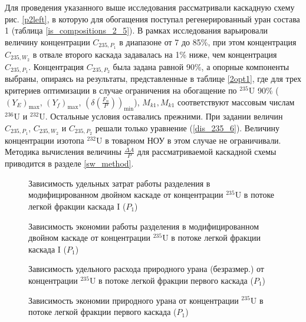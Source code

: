 Для проведения указанного выше исследования рассматривали каскадную схему рис. \ref{p2left}, в которую для обогащения поступал регенерированный уран состава 1 (таблица \ref{is_compositions_2_5}). В рамках исследования варьировали величину концентрации $C_{235,{P_1}}$ в диапазоне от 7 до 85\%, при этом концентрация $C_{235,{W_2}}$ в отвале второго каскада задавалась на 1\% ниже, чем концентрация $C_{235,{P_1}}$. Концентрация $C_{235,{P_2}}$ была задана равной 90\%, а опорные компоненты выбраны, опираясь на результаты, представленные в таблице \ref{2opt1}, где для трех критериев оптимизации в случае ограничения на обогащение по $^{235}$U 90\% ($(Y_{E})_\text{max}$, $(Y_f)_\text{max}$, $(\delta(\frac{F_n}{P}))_\text{min}$), $M_{k1}, M_{k1}$ соответствуют массовым числам $^{236}$U и $^{232}$U. Остальные условия оставались прежними. При задании величин $C_{235,{P_1}}$, $C_{235,{W_2}}$ и $C_{235,{P_2}}$  решали только уравнение (\ref{dis_235_6}). Величину концентрации изотопа $^{232}$U в товарном НОУ в этом случае не ограничивали.
Методика вычисления величины $\frac{\Delta A}{P}$ для рассматриваемой каскадной схемы приводится в разделе \ref{sw_method}.
\begin{figure}[ht]
    \centering
    \begin{minipage}{.5\textwidth}
        \centering
        
  \caption{{Зависимость удельных затрат работы разделения в модифицированном двойном каскаде  от концентрации $^{235}$U в потоке легкой фракции каскада I ($P_1$){\label{SWP1}}}}
  \end{minipage}%
    \begin{minipage}{.5\textwidth}
      \centering
      
\caption{{Зависимость экономии работы разделения в модифицированном двойном каскаде от концентрации $^{235}$U в потоке легкой фракции каскада I ($P_1$){\label{SW_lP1}}}}
    \end{minipage}
\end{figure}

\begin{figure}[ht]
    \centering
    \begin{minipage}{.5\textwidth}
        \centering
        
  \caption{{Зависимость удельного расхода природного урана (безразмер.) от концентрации $^{235}$U в потоке легкой фракции первого каскада ($P_1$){\label{FnuP1}}}}
  \end{minipage}%
    \begin{minipage}{.5\textwidth}
      \centering
      
\caption{{Зависимость экономии природного урана от концентрации $^{235}$U в потоке легкой фракции первого каскада ($P_1$){\label{pFoP1}}}}
    \end{minipage}
\end{figure}


